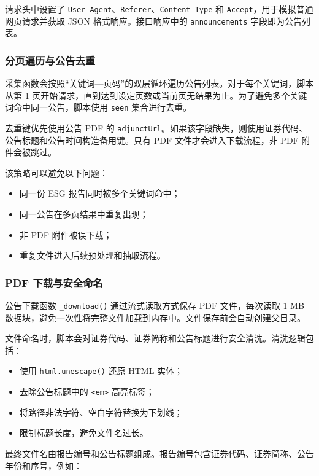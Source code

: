 \documentclass[UTF8,a4paper,12pt]{ctexart}
\begin{document}
请求头中设置了 \texttt{User-Agent}、\texttt{Referer}、\texttt{Content-Type} 和 \texttt{Accept}，用于模拟普通网页请求并获取 JSON 格式响应。接口响应中的 \texttt{announcements} 字段即为公告列表。

\subsubsection{分页遍历与公告去重}

采集函数会按照“关键词—页码”的双层循环遍历公告列表。对于每个关键词，脚本从第 1 页开始请求，直到达到设定页数或当前页无结果为止。为了避免多个关键词命中同一公告，脚本使用 \texttt{seen} 集合进行去重。

去重键优先使用公告 PDF 的 \texttt{adjunctUrl}。如果该字段缺失，则使用证券代码、公告标题和公告时间构造备用键。只有 PDF 文件才会进入下载流程，非 PDF 附件会被跳过。

该策略可以避免以下问题：

\begin{itemize}
  \item 同一份 ESG 报告同时被多个关键词命中；
  \item 同一公告在多页结果中重复出现；
  \item 非 PDF 附件被误下载；
  \item 重复文件进入后续预处理和抽取流程。
\end{itemize}

\subsubsection{PDF 下载与安全命名}

公告下载函数 \texttt{\_download()} 通过流式读取方式保存 PDF 文件，每次读取 1 MB 数据块，避免一次性将完整文件加载到内存中。文件保存前会自动创建父目录。

文件命名时，脚本会对证券代码、证券简称和公告标题进行安全清洗。清洗逻辑包括：

\begin{itemize}
  \item 使用 \texttt{html.unescape()} 还原 HTML 实体；
  \item 去除公告标题中的 \texttt{<em>} 高亮标签；
  \item 将路径非法字符、空白字符替换为下划线；
  \item 限制标题长度，避免文件名过长。
\end{itemize}

最终文件名由报告编号和公告标题组成。报告编号包含证券代码、证券简称、公告年份和序号，例如：
\end{document}
